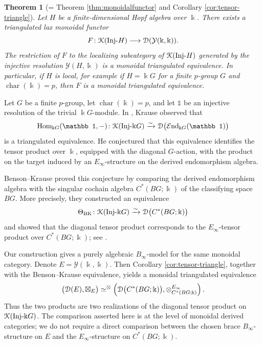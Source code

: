 \documentclass[a4paper, 11pt]{amsart}
\newtheorem{thmy}{Theorem}
\theoremstyle{definition}
\theoremstyle{remark}
\numberwithin{equation}{section}
\newcommand{\Y}{\mathcal{Y}}
\newcommand{\Hom}{\mathrm{Hom}}
\newcommand{\ED}{\EuScript{D}}
\newcommand{\EK}{\EuScript{K}}
\begin{document}
\begin{thmy}[= Theorem \ref{thm:monoidalfunctor} and Corollary \ref{cor:tensor-triangle}] \label{thmB}
Let $H$ be a finite-dimensional Hopf algebra over $\Bbbk$. There exists a triangulated lax monoidal functor
\[
F\colon \EK(\mathrm{Inj}\text{-}H) \longrightarrow \ED(\Y(\Bbbk, \Bbbk)).
\]
The restriction of $F$ to the localizing subcategory of $\EK(\mathrm{Inj}\text{-}H)$ generated by the injective resolution $\Y(H,\Bbbk)$ is a monoidal triangulated equivalence. In particular, if $H$ is local, for example if $H=\Bbbk G$ for a finite $p$-group $G$ and $\operatorname{char}(\Bbbk)=p$, then $F$ is a monoidal triangulated equivalence.
\end{thmy}

Let $G$ be a finite $p$-group, let
$\operatorname{char}(\Bbbk)=p$, and let $\mathbb 1$ be an injective
resolution of the trivial $\Bbbk G$-module. In
\cite[Example 2.5]{Kra}, Krause observed that
\[
\Hom_{\Bbbk G}(\mathbb 1,-)\colon
\EK(\mathrm{Inj}\text{-}\Bbbk G)
\xrightarrow{\sim}
\ED\bigl(\mathcal E\mathrm{nd}_{\Bbbk G}(\mathbb 1)\bigr)
\]
is a triangulated equivalence. He conjectured that this equivalence
identifies the tensor product over $\Bbbk$, equipped with the diagonal
$G$-action, with the product on the target induced by an
$E_\infty$-structure on the derived endomorphism algebra.

Benson--Krause proved this conjecture by comparing the derived
endomorphism algebra with the singular cochain algebra
$C^*(BG;\Bbbk)$ of the classifying space $BG$. More precisely, they constructed an equivalence
\[
\Theta_{\mathrm{BK}}\colon
\EK(\mathrm{Inj}\text{-}\Bbbk G)
\xrightarrow{\sim}
\ED\bigl(C^*(BG;\Bbbk)\bigr)
\]
and showed that the diagonal tensor product corresponds to the
$E_\infty$-tensor product over $C^*(BG;\Bbbk)$; see
\cite[Theorems 4.2 and 7.8]{BeKr}.

Our construction gives a purely algebraic $B_\infty$-model for the
same monoidal category. Denote \(E=\Y(\Bbbk,\Bbbk)\). Then Corollary \ref{cor:tensor-triangle}, together with the
Benson--Krause equivalence, yields a monoidal triangulated equivalence
\[
\bigl(\ED(E),\boxtimes_E\bigr)
\simeq^\otimes
\left(
\ED\bigl(C^*(BG;\Bbbk)\bigr),
\otimes^{E_\infty}_{C^*(BG;\Bbbk)}
\right).
\]
Thus the two products are two realizations of the diagonal tensor
product on $\EK(\mathrm{Inj}\text{-}\Bbbk G)$. The comparison asserted
here is at the level of monoidal derived categories; we do not require
a direct comparison between the chosen brace $B_\infty$-structure on
$E$ and the $E_\infty$-structure on $C^*(BG;\Bbbk)$.
\end{document}
